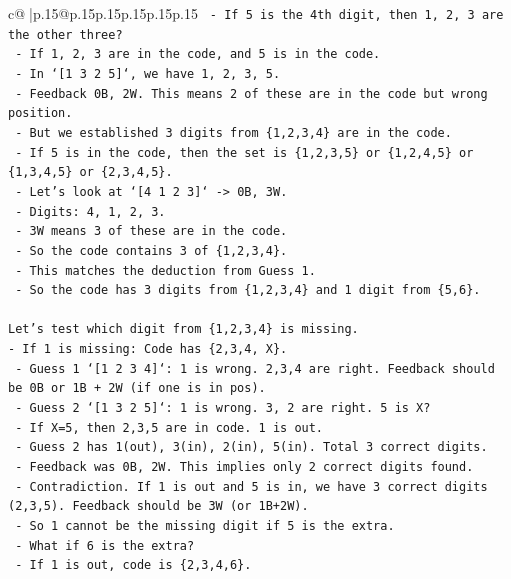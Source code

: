 \documentclass{article}
\begin{document}
{\begin{supertabular}{c@{$\;$}|p{.15\linewidth}@{}p{.15\linewidth}p{.15\linewidth}p{.15\linewidth}p{.15\linewidth}p{.15\linewidth}}
{{{\texttt{  {-} If 5 is the 4th digit, then 1, 2, 3 are the other three?} \\
\texttt{  {-} If 1, 2, 3 are in the code, and 5 is in the code.} \\
\texttt{  {-} In `{[}1 3 2 5{]}`, we have 1, 2, 3, 5.} \\
\texttt{  {-} Feedback 0B, 2W. This means 2 of these are in the code but wrong position.} \\
\texttt{  {-} But we established 3 digits from \{1,2,3,4\} are in the code.} \\
\texttt{  {-} If 5 is in the code, then the set is \{1,2,3,5\} or \{1,2,4,5\} or \{1,3,4,5\} or \{2,3,4,5\}.} \\
\texttt{  {-} Let's look at `{[}4 1 2 3{]}` {-}> 0B, 3W.} \\
\texttt{    {-} Digits: 4, 1, 2, 3.} \\
\texttt{    {-} 3W means 3 of these are in the code.} \\
\texttt{    {-} So the code contains 3 of \{1,2,3,4\}.} \\
\texttt{    {-} This matches the deduction from Guess 1.} \\
\texttt{    {-} So the code has 3 digits from \{1,2,3,4\} and 1 digit from \{5,6\}.} \\
\\ 
\texttt{Let's test which digit from \{1,2,3,4\} is missing.} \\
\texttt{{-} If 1 is missing: Code has \{2,3,4, X\}.} \\
\texttt{  {-} Guess 1 `{[}1 2 3 4{]}`: 1 is wrong. 2,3,4 are right. Feedback should be 0B or 1B + 2W (if one is in pos).} \\
\texttt{  {-} Guess 2 `{[}1 3 2 5{]}`: 1 is wrong. 3, 2 are right. 5 is X?} \\
\texttt{    {-} If X=5, then 2,3,5 are in code. 1 is out.} \\
\texttt{    {-} Guess 2 has 1(out), 3(in), 2(in), 5(in). Total 3 correct digits.} \\
\texttt{    {-} Feedback was 0B, 2W. This implies only 2 correct digits found.} \\
\texttt{    {-} Contradiction. If 1 is out and 5 is in, we have 3 correct digits (2,3,5). Feedback should be 3W (or 1B+2W).} \\
\texttt{    {-} So 1 cannot be the missing digit if 5 is the extra.} \\
\texttt{    {-} What if 6 is the extra?} \\
\texttt{    {-} If 1 is out, code is \{2,3,4,6\}.} \\
}}}
\end{supertabular}}
\end{document}
